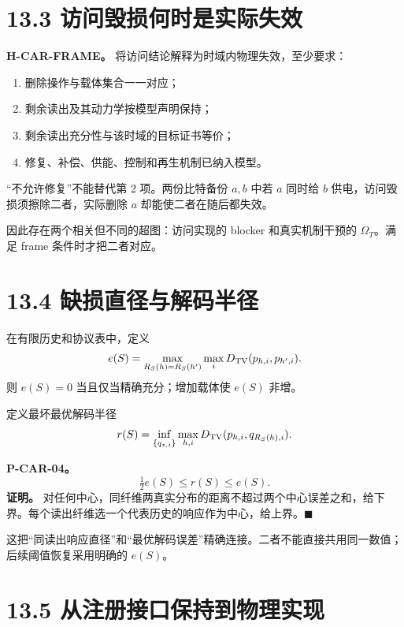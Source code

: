\documentclass[
  11pt,
  oneside]{book}
\providecommand{\tightlist}{%
  \setlength{\itemsep}{0pt}\setlength{\parskip}{0pt}}
\begin{document}
\section{13.3 访问毁损何时是实际失效}\label{ux8bbfux95eeux6bc1ux635fux4f55ux65f6ux662fux5b9eux9645ux5931ux6548}

\textbf{H-CAR-FRAME。} 将访问结论解释为时域内物理失效，至少要求：

\begin{enumerate}
\def\labelenumi{\arabic{enumi}.}
\tightlist
\item
  删除操作与载体集合一一对应；
\item
  剩余读出及其动力学按模型声明保持；
\item
  剩余读出充分性与该时域的目标证书等价；
\item
  修复、补偿、供能、控制和再生机制已纳入模型。
\end{enumerate}

``不允许修复''不能替代第 2 项。两份比特备份 \(a,b\) 中若 \(a\) 同时给 \(b\) 供电，访问毁损须擦除二者，实际删除 \(a\) 却能使二者在随后都失效。

因此存在两个相关但不同的超图：访问实现的 blocker 和真实机制干预的 \(\Omega_T\)。满足 frame 条件时才把二者对应。

\section{13.4 缺损直径与解码半径}\label{ux7f3aux635fux76f4ux5f84ux4e0eux89e3ux7801ux534aux5f84}

在有限历史和协议表中，定义 \[e(S)=\max_{R_S(h)=R_S(h')}\max_i
D_{\rm TV}(p_{h,i},p_{h',i}).\] 则 \(e(S)=0\) 当且仅当精确充分；增加载体使 \(e(S)\) 非增。

定义最坏最优解码半径 \[r(S)=\inf_{\{q_{z,i}\}}\max_{h,i}
D_{\rm TV}(p_{h,i},q_{R_S(h),i}).\]

\hypertarget{p-car-04}{}\label{p-car-04}

\textbf{P-CAR-04。} \[\tfrac12e(S)\le r(S)\le e(S).\] \textbf{证明。} 对任何中心，同纤维两真实分布的距离不超过两个中心误差之和，给下界。每个读出纤维选一个代表历史的响应作为中心，给上界。\(\blacksquare\)

这把``同读出响应直径''和``最优解码误差''精确连接。二者不能直接共用同一数值；后续阈值恢复采用明确的 \(e(S)\)。

\section{13.5 从注册接口保持到物理实现}\label{ux4eceux6ce8ux518cux63a5ux53e3ux4fddux6301ux5230ux7269ux7406ux5b9eux73b0}
\end{document}
